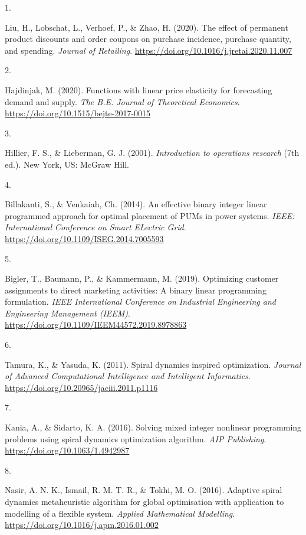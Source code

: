 \documentclass[
]{article}
\newlength{\cslhangindent}
\newlength{\csllabelwidth}
\newlength{\cslentryspacingunit} %
\newenvironment{CSLReferences}[2] %
 {%
  \setlength{\parindent}{0pt}
  \ifodd #1
  \let\oldpar\par
  \def\par{\hangindent=\cslhangindent\oldpar}
  \fi
  \setlength{\parskip}{#2\cslentryspacingunit}
 }%
 {}
\newcommand{\CSLLeftMargin}[1]{\parbox[t]{\csllabelwidth}{#1}}
\newcommand{\CSLRightInline}[1]{\parbox[t]{\linewidth - \csllabelwidth}{#1}\break}
\begin{document}
\hypertarget{refs}{}
\begin{CSLReferences}{0}{0}
\leavevmode{}%
\CSLLeftMargin{1. }%
\CSLRightInline{Liu, H., Lobschat, L., Verhoef, P., \& Zhao, H. (2020).
The effect of permanent product discounts and order coupons on purchase
incidence, purchase quantity, and spending. \emph{Journal of Retailing}.
\url{https://doi.org/10.1016/j.jretai.2020.11.007}}

\leavevmode{}%
\CSLLeftMargin{2. }%
\CSLRightInline{Hajdinjak, M. (2020). Functions with linear price
elasticity for forecasting demand and supply. \emph{The B.E. Journal of
Theoretical Economics}. \url{https://doi.org/10.1515/bejte-2017-0015}}

\leavevmode{}%
\CSLLeftMargin{3. }%
\CSLRightInline{Hillier, F. S., \& Lieberman, G. J. (2001).
\emph{Introduction to operations research} (7th ed.). New York, US:
McGraw Hill.}

\leavevmode{}%
\CSLLeftMargin{4. }%
\CSLRightInline{Billakanti, S., \& Venkaiah, Ch. (2014). An effective
binary integer linear programmed approach for optimal placement of PUMs
in power systems. \emph{IEEE: International Conference on Smart ELectric
Grid}. \url{https://doi.org/10.1109/ISEG.2014.7005593}}

\leavevmode{}%
\CSLLeftMargin{5. }%
\CSLRightInline{Bigler, T., Baumann, P., \& Kammermann, M. (2019).
Optimizing customer assignments to direct marketing activities: A binary
linear programming formulation. \emph{IEEE International Conference on
Industrial Engineering and Engineering Management (IEEM)}.
\url{https://doi.org/10.1109/IEEM44572.2019.8978863}}

\leavevmode{}%
\CSLLeftMargin{6. }%
\CSLRightInline{Tamura, K., \& Yasuda, K. (2011). Spiral dynamics
inspired optimization. \emph{Journal of Advanced Computational
Intelligence and Intelligent Informatics}.
\url{https://doi.org/10.20965/jaciii.2011.p1116}}

\leavevmode{}%
\CSLLeftMargin{7. }%
\CSLRightInline{Kania, A., \& Sidarto, K. A. (2016). Solving mixed
integer nonlinear programming problems using spiral dynamics
optimization algorithm. \emph{AIP Publishing}.
\url{https://doi.org/10.1063/1.4942987}}

\leavevmode{}%
\CSLLeftMargin{8. }%
\CSLRightInline{Nasir, A. N. K., Ismail, R. M. T. R., \& Tokhi, M. O.
(2016). Adaptive spiral dynamics metaheuristic algorithm for global
optimisation with application to modelling of a flexible system.
\emph{Applied Mathematical Modelling}.
\url{https://doi.org/10.1016/j.apm.2016.01.002}}


\end{CSLReferences}
\end{document}
